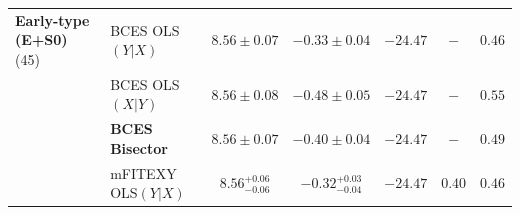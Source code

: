 \documentclass[preprint2]{emulateapj}
\begin{document}
\begin{table}
\begin{tabular}{llccccc}
%
%
{\bf Early-type (E+S0)} (45) & BCES OLS$(Y|X)$    & $8.56 \pm 0.07$ & $-0.33 \pm 0.04$ & $-24.47$ & $-$    & $0.46$ \\
                             & BCES OLS$(X|Y)$    & $8.56 \pm 0.08$ & $-0.48 \pm 0.05$ & $-24.47$ & $-$    & $0.55$ \\
                             & {\bf BCES Bisector}& $\boldsymbol{8.56 \pm 0.07}$ & $\boldsymbol{-0.40 \pm 0.04}$ & $\boldsymbol{-24.47}$ & $-$    & $\boldsymbol{0.49}$ \\
                             & mFITEXY OLS$(Y|X)$ & $8.56^{+0.06}_{-0.06}$ & $-0.32^{+0.03}_{-0.04}$ & $-24.47$ & $0.40$ & $0.46$ \\

\end{tabular}
\end{table}
\end{document}
